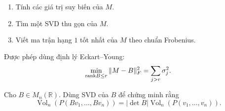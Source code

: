 ﻿\documentclass[12pt,a4paper]{article}
\begin{document}
\begin{problem}[7 điểm]


\begin{enumerate}[label=(\alph*)]
    \item Tính các giá trị suy biến của $M$.
    \item Tìm một SVD thu gọn của $M$.
    \item Viết ma trận hạng $1$ tốt nhất của $M$ theo chuẩn Frobenius.
\end{enumerate}

Được phép dùng định lý Eckart--Young:
\[
\min_{\mathrm{rank} B\le r}\|M-B\|_F^2=
\sum_{j>r}\sigma_j^2.
\]



\end{problem}

\begin{problem}[5 điểm]
Cho \(B\in M_n(\mathbb R)\). Dùng SVD của \(B\) để chứng minh rằng
\[
\operatorname{Vol}_n(P(Bv_1,\ldots,Bv_n))
=
|\det B|\operatorname{Vol}_n(P(v_1,\ldots,v_n)).
\]
\end{problem}
\end{document}
